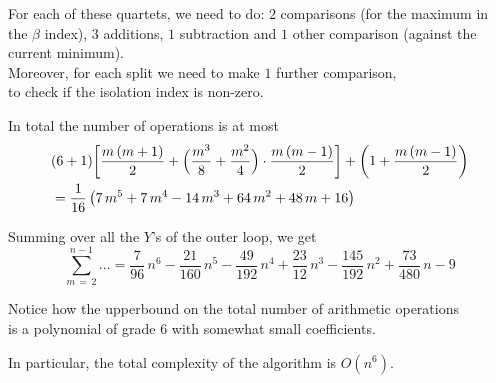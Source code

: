 \documentclass[./main.tex]{subfiles}
\begin{document}
For each of these quartets, we need to do: $2$ comparisons (for the maximum in the $\beta$ index), $3$ additions, $1$ subtraction and $1$ other comparison (against the current minimum). \\
Moreover, for each split we need to make $1$ further comparison, \\
\bsp to check if the isolation index is non-zero.

In total the number of operations is at most
\begin{align*}
&(6 + 1) \biggl[ \frac{m\,(m + 1)}{2} + \Bigl( \frac{m^3}{8} + \frac{m^2}{4} \Bigr) \cdot \frac{m\,(m - 1)}{2} \biggr] + \biggl( 1 + \frac{m\,(m - 1)}{2} \biggr) \\
&= \frac{1}{16}\, \bigl( 7\,m^5 + 7\,m^4 - 14\,m^3 + 64\,m^2 + 48\,m + 16 \bigr)
\end{align*}

Summing over all the $Y$'s of the outer loop, we get
\[ \sum_{m \,=\, 2}^{n - 1} \ldots = \frac{7}{96}\,n^6 - \frac{21}{160}\,n^5 - \frac{49}{192}\,n^4 + \frac{23}{12}\,n^3 - \frac{145}{192}\,n^2 + \frac{73}{480}\,n - 9 \]

Notice how the upperbound on the total number of arithmetic operations \\
\bsp is a polynomial of grade $6$ with somewhat small coefficients.

In particular, the total complexity of the algorithm is $O(n^6)$.
\end{document}
